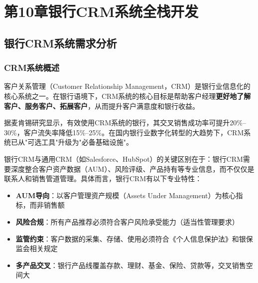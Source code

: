
\chapter{第10章\quad 银行CRM系统全栈开发}


\section{银行CRM系统需求分析}

\subsection{CRM系统概述}

客户关系管理（Customer Relationship Management，CRM）是银行业信息化的核心系统之一。在银行语境下，CRM系统的核心目标是帮助客户经理\textbf{更好地了解客户、服务客户、拓展客户}，从而提升客户满意度和银行收益。\par

据麦肯锡研究显示，有效使用CRM系统的银行，其交叉销售成功率可提升20\%--30\%，客户流失率降低15\%--25\%。在国内银行业数字化转型的大趋势下，CRM系统已从"可选工具"升级为"必备基础设施"。\par

银行CRM与通用CRM（如Salesforce、HubSpot）的关键区别在于：银行CRM需要深度整合客户资产数据（AUM）、风险评级、产品持有等专业信息，而不仅仅是联系人和销售管道管理。具体而言，银行CRM有以下专业特性：\par

\begin{itemize}[leftmargin=2em]
  \item \textbf{AUM导向}：以客户管理资产规模（Assets Under Management）为核心指标，而非销售额
  \item \textbf{风险合规}：所有产品推荐必须符合客户风险承受能力（适当性管理要求）
  \item \textbf{监管约束}：客户数据的采集、存储、使用必须符合《个人信息保护法》和银保监会相关规定
  \item \textbf{多产品交叉}：银行产品线覆盖存款、理财、基金、保险、贷款等，交叉销售空间大
\end{itemize}\par

